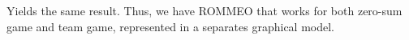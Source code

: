 Yields the same result. Thus, we have ROMMEO that works for both zero-sum game and team game, represented in a separates graphical model. 






















